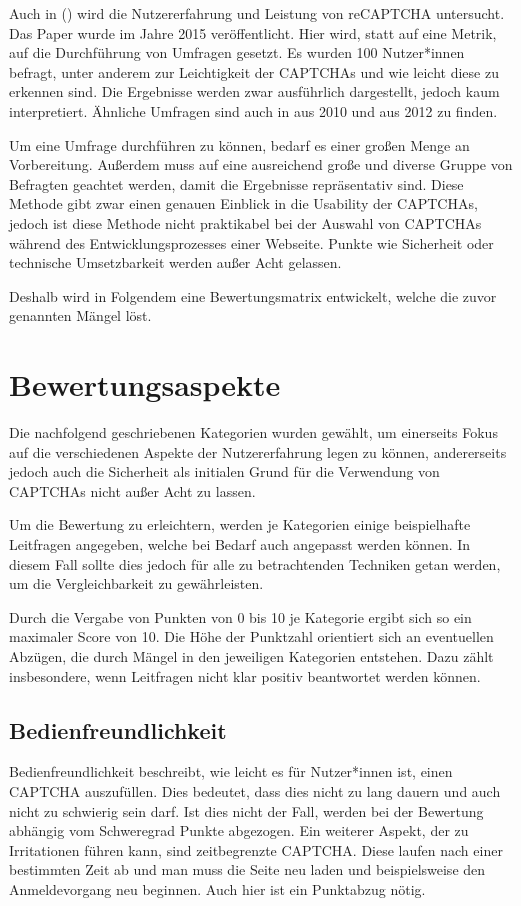 Auch in  (\cite{Beheshti}) wird die Nutzererfahrung und Leistung von reCAPTCHA untersucht.
Das Paper wurde im Jahre 2015 veröffentlicht.
Hier wird, statt auf eine Metrik, auf die Durchführung von Umfragen gesetzt.
Es wurden 100 Nutzer*innen befragt, unter anderem zur Leichtigkeit der CAPTCHAs und wie leicht diese zu erkennen sind.
Die Ergebnisse werden zwar ausführlich dargestellt, jedoch kaum interpretiert.
\cite{Beheshti}
Ähnliche Umfragen sind auch in \cite{madathil2010investigation} aus 2010 und \cite{wismer} aus 2012 zu finden.

Um eine Umfrage durchführen zu können, bedarf es einer großen Menge an Vorbereitung.
Außerdem muss auf eine ausreichend große und diverse Gruppe von Befragten geachtet werden, damit die Ergebnisse repräsentativ sind.
Diese Methode gibt zwar einen genauen Einblick in die Usability der CAPTCHAs, 
jedoch ist diese Methode nicht praktikabel bei der Auswahl von CAPTCHAs während des Entwicklungsprozesses einer Webseite.
Punkte wie Sicherheit oder technische Umsetzbarkeit werden außer Acht gelassen.

Deshalb wird in Folgendem eine Bewertungsmatrix entwickelt, welche die zuvor genannten Mängel löst.

\section{Bewertungsaspekte}
\label{ch:matrix:aspekte}
Die nachfolgend geschriebenen Kategorien wurden gewählt, um einerseits Fokus auf die verschiedenen Aspekte der Nutzererfahrung legen zu können,
andererseits jedoch auch die Sicherheit als initialen Grund für die Verwendung von CAPTCHAs nicht außer Acht zu lassen.

Um die Bewertung zu erleichtern, werden je Kategorien einige beispielhafte Leitfragen angegeben, welche bei Bedarf auch angepasst werden können.
In diesem Fall sollte dies jedoch für alle zu betrachtenden Techniken getan werden, um die Vergleichbarkeit zu gewährleisten.

Durch die Vergabe von Punkten von 0 bis 10 je Kategorie ergibt sich so ein maximaler Score von 10.
Die Höhe der Punktzahl orientiert sich an eventuellen Abzügen, die durch Mängel in den jeweiligen Kategorien entstehen.
Dazu zählt insbesondere, wenn Leitfragen nicht klar positiv beantwortet werden können.

\subsection{Bedienfreundlichkeit}
\label{ch:matrix:aspekte:Bedienfreundlichkeit}
Bedienfreundlichkeit beschreibt, wie leicht es für Nutzer*innen ist, einen CAPTCHA auszufüllen.
Dies bedeutet, dass dies nicht zu lang dauern und auch nicht zu schwierig sein darf. 
Ist dies nicht der Fall, werden bei der Bewertung abhängig vom Schweregrad Punkte abgezogen. %
Ein weiterer Aspekt, der zu Irritationen führen kann, sind zeitbegrenzte CAPTCHA. 
Diese laufen nach einer bestimmten Zeit ab und man muss die Seite neu laden und beispielsweise den Anmeldevorgang neu beginnen.
Auch hier ist ein Punktabzug nötig.

